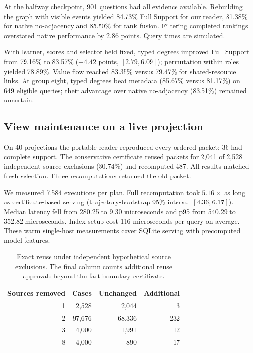 \documentclass[conference]{IEEEtran}
\begin{document}
At the halfway checkpoint, 901 questions had all evidence available. Rebuilding the graph with visible events yielded 84.73\% Full Support for our reader, 81.38\% for native no-adjacency and 85.50\% for rank fusion. Filtering completed rankings overstated native performance by 2.86 points. Query times are simulated.

With learner, scores and selector held fixed, typed degrees improved Full Support from 79.16\% to 83.57\% ($+4.42$ points, $[2.79,6.09]$); permutation within roles yielded 78.89\%. Value flow reached 83.35\% versus 79.47\% for shared-resource links. At group eight, typed degrees beat metadata (85.67\% versus 81.17\%) on 649 eligible queries; their advantage over native no-adjacency (83.51\%) remained uncertain.


\subsection{View maintenance on a live projection}
On 40 projections the portable reader reproduced every ordered packet; 36 had complete support. The conservative certificate reused packets for 2,041 of 2,528 independent source exclusions (80.74\%) and recomputed 487. All results matched fresh selection. Three recomputations returned the old packet.

We measured 7,584 executions per plan. Full recomputation took $5.16\times$ as long as certificate-based serving (trajectory-bootstrap 95\% interval $[4.36,6.17]$). Median latency fell from 280.25 to 9.30 microseconds and p95 from 540.29 to 352.82 microseconds. Index setup cost 116 microseconds per query on average. These warm single-host measurements cover SQLite serving with precomputed model features. 

\balance
\begin{table}[t]
\caption{Exact reuse under independent hypothetical source exclusions. The final column counts additional reuse approvals beyond the fast boundary certificate.}
\centering\small
\begin{tabular}{rrrr}\toprule
Sources removed & Cases & Unchanged & Additional\\\midrule
1 & 2,528 & 2,044 & 3\\
2 & 97,676 & 68,336 & 232\\
3 & 4,000 & 1,991 & 12\\
8 & 4,000 & 890 & 17\\
\bottomrule\end{tabular}
\label{tab:exclusions}
\end{table}
\end{document}
